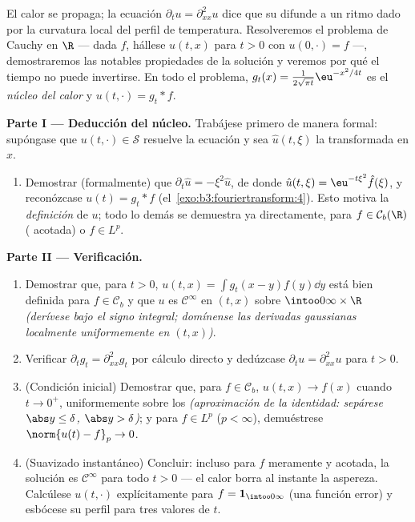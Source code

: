 \begin{problem}[{Problema de fin de semana --- $\partial_tu =
\partial^2_{xx}u$, resuelta de principio a fin}]
\label{pb:b3:fouriertransform:1}
El calor se propaga; la ecuación $\partial_tu = \partial_{xx}^2u$ dice
que su  difunde a un ritmo dado
por la curvatura local del perfil de temperatura. Resolveremos el
problema de Cauchy en $\R$ --- dada $f$, hállese $u(t, x)$ para $t > 0$
con $u(0, \cdot) = f$ ---, demostraremos las notables propiedades de la
solución y veremos por qué el tiempo no puede invertirse. En todo el
problema, $g_t(x) = \frac1{2\sqrt{\pi t}}\eu^{-x^2/4t}$ es el
\emph{núcleo del calor} y $u(t, \cdot) = g_t *
f$.

\medskip
\noindent\textbf{Parte I --- Deducción del núcleo.} Trabájese primero de
manera formal: supóngase que $u(t, \cdot) \in \mathcal S$ resuelve la
ecuación y sea $\hat u(t, \xi)$ la transformada en
$x$.
\begin{enumerate}
  \item Demostrar (formalmente) que $\partial_t\hat u = -\xi^2\hat u$,
  de donde $\hat u(t,\xi) = \eu^{-t\xi^2}\hat f(\xi)$, y reconózcase
  $u(t) = g_t * f$ (el~\cref{exo:b3:fouriertransform:4}). Esto motiva la
  \emph{definición} de $u$; todo lo demás se demuestra ya directamente,
  para $f \in \mathcal C_b(\R)$
  ( acotada) o $f \in L^p$.
\end{enumerate}

\medskip
\noindent\textbf{Parte II --- Verificación.}
\begin{enumerate}[resume]
  \item Demostrar que, para $t > 0$, $u(t, x) = \int
        g_t(x-y)f(y)\dd y$ está bien definida para $f \in \mathcal
        C_b$ y que $u$ es $\mathcal C^\infty$ en $(t, x)$ sobre
  $\intoo0\infty\times\R$ \emph{(derívese bajo el signo integral;
  domínense las derivadas gaussianas localmente uniformemente en
  $(t,x)$)}. \item Verificar $\partial_tg_t = \partial^2_{xx}g_t$ por
  cálculo directo y dedúzcase $\partial_tu =
        \partial^2_{xx}u$ para $t > 0$. \item (Condición inicial)
  Demostrar que, para $f \in \mathcal
        C_b$, $u(t, x) \to f(x)$ cuando $t \to 0^+$, uniformemente sobre
  los  \emph{(aproximación de
  la identidad: sepárese $\abs y
        \leq \delta$, $\abs y > \delta$)}; y para $f \in L^p$
  ($p < \infty$), demuéstrese $\norm{u(t) - f}_p \to 0$. \item
  (Suavizado instantáneo) Concluir: incluso para $f$ meramente
   y acotada, la solución
  es $\mathcal C^\infty$ para todo $t > 0$ --- el calor borra al
  instante la aspereza. Calcúlese $u(t, \cdot)$ explícitamente para $f =
        \mathbf 1_{\intoo0\infty}$ (una función error) y esbócese su
  perfil para tres valores de $t$.
\end{enumerate}


\end{problem}
